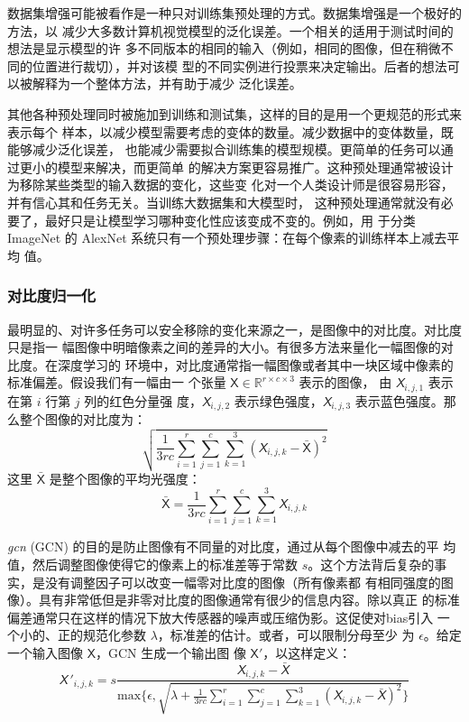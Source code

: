 数据集增强可能被看作是一种只对训练集预处理的方式。数据集增强是一个极好的方法，以
减少大多数计算机视觉模型的泛化误差。一个相关的适用于测试时间的想法是显示模型的许
多不同版本的相同的输入（例如，相同的图像，但在稍微不同的位置进行裁切），并对该模
型的不同实例进行投票来决定输出。后者的想法可以被解释为一个整体方法，并有助于减少
泛化误差。

其他各种预处理同时被施加到训练和测试集，这样的目的是用一个更规范的形式来表示每个
样本，以减少模型需要考虑的变体的数量。减少数据中的变体数量，既能够减少泛化误差，
也能减少需要拟合训练集的模型规模。更简单的任务可以通过更小的模型来解决，而更简单
的解决方案更容易推广。这种预处理通常被设计为移除某些类型的输入数据的变化，这些变
化对一个人类设计师是很容易形容，并有信心其和任务无关。当训练大数据集和大模型时，
这种预处理通常就没有必要了，最好只是让模型学习哪种变化性应该变成不变的。例如，用
于分类 ImageNet 的 AlexNet 系统只有一个预处理步骤：在每个像素的训练样本上减去平均
值\citep{Krizhevsky-2012}。

\subsubsection{对比度归一化}
\label{subsubsec:contrast_nomalization}

最明显的、对许多任务可以安全移除的变化来源之一，是图像中的对比度。对比度只是指一
幅图像中明暗像素之间的差异的大小。有很多方法来量化一幅图像的对比度。在深度学习的
环境中，对比度通常指一幅图像或者其中一块区域中像素的标准偏差。假设我们有一幅由一
个张量 $\mathsf{X} \in \mathbb{R}^{r \times c \times 3}$ 表示的图像，
由 $\mathsfit{X}_{i,j,1}$ 表示在第 $i$ 行第 $j$ 列的红色分量强
度，$\mathsfit{X}_{i,j,2}$ 表示绿色强度，$\mathsfit{X}_{i,j,3}$ 表示蓝色强度。那
么整个图像的对比度为：
\begin{equation}
  \sqrt{\frac{1}{3rc}\displaystyle\sum_{i=1}^r\sum_{j=1}^c\sum_{k=1}^3(\mathsfit{X}_{i,j,k}
    - \bar{\pmb{\mathsf{X}}})^2}
  \label{eq:12.1}
\end{equation}
这里 $\bar{\pmb{\mathsf{X}}}$ 是整个图像的平均光强度：
\begin{equation}
  \bar{\pmb{\mathsf{X}}} = \frac{1}{3rc}\displaystyle\sum_{i=1}^r\sum_{j=1}^c\sum_{k=1}^3\mathsfit{X}_{i,j,k}
  \label{eq:12.2}
\end{equation}

\emph{\gls{gcn}} (GCN) 的目的是防止图像有不同量的对比度，通过从每个图像中减去的平
均值，然后调整图像使得它的像素上的标准差等于常数
$s$。这个方法背后复杂的事实，是没有调整因子可以改变一幅零对比度的图像（所有像素都
有相同强度的图像）。具有非常低但是非零对比度的图像通常有很少的信息内容。除以真正
的标准偏差通常只在这样的情况下放大传感器的噪声或压缩伪影。这促使对\gls*{bias}引入
一个小的、正的规范化参数 $\lambda$，标准差的估计。或者，可以限制分母至少
为 $\epsilon$。给定一个输入图像 $\pmb{\mathsf{X}}$，GCN 生成一个输出图
像 $\pmb{\mathsf{X}}'$，以这样定义：
\begin{equation}
  \mathsfit{X}\,'_{i,j,k} = s \frac{
    \mathsfit{X}_{i,j,k} - \bar{\mathsfit{X}}
  }{
    \mathrm{max}\bigg\{\epsilon, \sqrt{\lambda + \frac{1}{3rc}\sum_{i=1}^r\sum_{j=1}^c\sum_{k=1}^3(\mathsfit{X}_{i,j,k} - \bar{\mathsfit{X}})^2}\bigg\}
  }
  \label{eq:12.3}
\end{equation}

